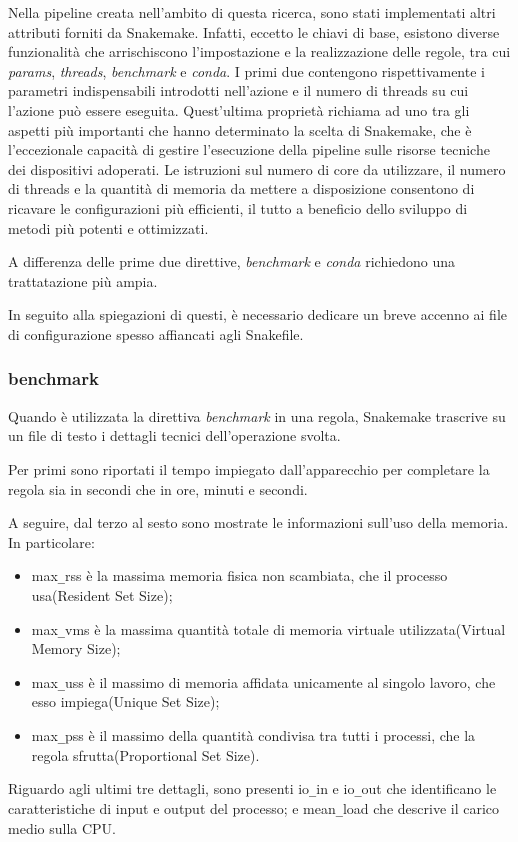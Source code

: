 Nella pipeline creata nell'ambito di questa ricerca, sono stati implementati altri attributi forniti da Snakemake.
Infatti, eccetto le chiavi di base, esistono diverse funzionalità che arrischiscono l'impostazione e la realizzazione delle regole, tra cui \textit{params}, \textit{threads}, \textit{benchmark} e \textit{conda}.
I primi due contengono rispettivamente i parametri indispensabili introdotti nell'azione e il numero di threads su cui l'azione può essere eseguita.
Quest'ultima proprietà richiama ad uno tra gli aspetti più importanti che hanno determinato la scelta di Snakemake, che è  l'eccezionale capacità di gestire l'esecuzione della pipeline sulle risorse tecniche dei dispositivi adoperati.
Le istruzioni sul numero di core da utilizzare, il numero di threads e la quantità di memoria da mettere a disposizione consentono di ricavare le configurazioni più efficienti, il tutto a beneficio dello sviluppo di metodi più potenti e ottimizzati.

A differenza delle prime due direttive, \textit{benchmark} e \textit{conda} richiedono una trattatazione più ampia.

In seguito alla spiegazioni di questi, è necessario dedicare un breve accenno ai file di configurazione spesso affiancati agli Snakefile.

\subsubsection{benchmark}
\label{subsubsec: SMb}
Quando è utilizzata la direttiva \textit{benchmark} in una regola, Snakemake trascrive su un file di testo i dettagli tecnici dell'operazione svolta.

Per primi sono riportati il tempo impiegato dall'apparecchio per completare la regola sia in secondi che in ore, minuti e secondi.

A seguire, dal terzo al sesto sono mostrate le informazioni sull'uso della memoria.
In particolare:
\begin{itemize}
\item max\verb!_!rss è la massima memoria fisica non scambiata, che il processo usa(Resident Set Size);
\item max\verb!_!vms è la massima quantità totale di memoria virtuale utilizzata(Virtual Memory Size);
\item max\verb!_!uss è il massimo di memoria affidata unicamente al singolo lavoro, che esso impiega(Unique Set Size);
\item max\verb!_!pss è il massimo della quantità condivisa tra tutti i processi, che la regola sfrutta(Proportional Set Size).
\end{itemize}
Riguardo agli ultimi tre dettagli, sono presenti io\verb!_!in e io\verb!_!out che identificano le caratteristiche di input e output del processo; e mean\verb!_!load che descrive il carico medio sulla CPU.

